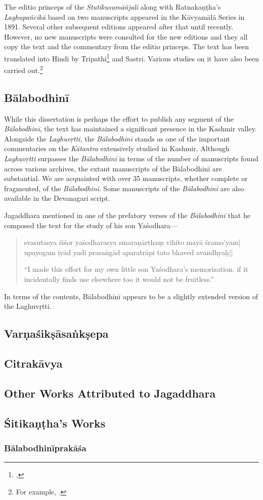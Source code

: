 The editio princeps of the \textit{Stutikusumāñjali} along with Ratnakaṇṭha's \emph{Laghupañcikā} based on two manuscripts appeared in the Kāvyamālā Series in 1891. Several other subsequent editions appeared after that until recently. However, no new manuscripts were consulted for the new editions and they all copy the text and the commentary from the editio princeps. The text has been translated into Hindi by Tripathi\footcite{Panta1964} and Sastri. Various studies on it have also been carried out.\footnote{For example, \cites{Stainton2016}{Tirtha1989}.} 


\subsection{Bālabodhinī}

While this dissertation is perhaps the effort to publish any segment of the \emph{Bālabodhinī}, the text has maintained a significant presence in the Kashmir valley. Alongside the \emph{Laghuvṛtti}, the \emph{Bālabodhinī} stands as one of the important commentaries on the \emph{Kātantra} extensively studied in Kashmir. Although \emph{Laghuvṛtti} surpasses the \emph{Bālabodhinī} in terms of the number of manuscripts found across various archives, the extant manuscripts of the Bālabodhinī are substantial. We are acquainted with over 35 manuscripts, whether complete or fragmented, of the \emph{Bālabodhinī}. Some manuscripts of the \emph{Bālabodhinī} are also available in the Devanagari script.  

Jagaddhara mentioned in one of the prefatory verses of the \emph{Bālabodhinī} that he composed the text for the study of his son Yaśodhara—

\begin{quote}
	
\textsanskrit{svasutasya śiśor yaśodharasya smaraṇārthaṃ vihito mayā śramo'yam|\\
	upayogam iyād yadi prasaṅgād aparatrāpi tato bhaved avandhyaḥ||}

“I made this effort for my own little son Yaśodhara's memorization. if it incidentally finds use elsewhere too it would not be fruitless.”
	
\end{quote}


In terms of the contents, Bālabodhinī appears to be a slightly extended version of the Laghuvṛtti. 


\subsection{Varṇaśikṣāsaṅkṣepa}

\subsection{Citrakāvya}

\subsection{Other Works Attributed to Jagaddhara}

\subsection{Śitikaṇṭha's Works}

\subsubsection{Bālabodhinīprakāśa}

